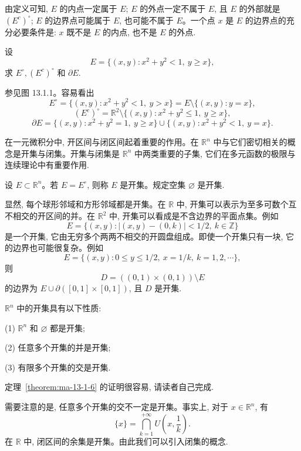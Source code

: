由定义可知, $E$ 的内点一定属于 $E$; $E$ 的外点一定不属于 $E$, 且 $E$ 的外部就是 $(E^c)^\circ$; $E$ 的边界点可能属于 $E$, 也可能不属于 $E$。一个点 $x$ 是 $E$ 的边界点的充分必要条件是: $x$ 既不是 $E$ 的内点, 也不是 $E$ 的外点.

\begin{example}\label{example:ma-13-1-4}
设
\[
  E=\{(x,y):x^2+y^2<1,\ y\geqslant x\},
\]
求 $E^\circ,(E^c)^\circ$ 和 $\partial E$.
\end{example}


\begin{solve}
参见图 13.1.1。容易看出
\[
  E^\circ=\{(x,y):x^2+y^2<1,\ y>x\}=E\setminus\{(x,y):y=x\},
\]
\[
  (E^c)^\circ=\mathbb R^2\setminus\{(x,y):x^2+y^2\leqslant1,\ y\geqslant x\},
\]
\[
  \partial E=\{(x,y):x^2+y^2=1,\ y\geqslant x\}\cup\{(x,y):x^2+y^2<1,\ y=x\}.
\]

在一元微积分中, 开区间与闭区间起着重要的作用。在 $\mathbb R^n$ 中与它们密切相关的概念是开集与闭集。开集与闭集是 $\mathbb R^n$ 中两类重要的子集, 它们在多元函数的极限与连续理论中有重要作用.
\end{solve}


\begin{definition}\label{definition:ma-13-1-6}
设 $E\subset\mathbb R^n$。若 $E=E^\circ$, 则称 $E$ 是开集。规定空集 $\varnothing$ 是开集.
\end{definition}

显然, 每个球形邻域和方形邻域都是开集。在 $\mathbb R$ 中, 开集可以表示为至多可数个互不相交的开区间的并。在 $\mathbb R^2$ 中, 开集可以看成是不含边界的平面点集。例如
\[
  E=\{(x,y): |(x,y)-(0,k)|<1/2,\ k\in\mathbb Z\}
\]
是一个开集, 它由无穷多个两两不相交的开圆盘组成。即使一个开集只有一块, 它的边界也可能很复杂。例如
\[
  E=\{(x,y):0\leqslant y\leqslant 1/2,\ x=1/k,\ k=1,2,\cdots\},
\]
则
\[
  D=((0,1)\times(0,1))\setminus E
\]
的边界为 $E\cup\partial([0,1]\times[0,1])$, 且 $D$ 是开集.

\begin{theorem}\label{theorem:ma-13-1-6}
$\mathbb R^n$ 中的开集具有以下性质:

(1) $\mathbb R^n$ 和 $\varnothing$ 都是开集;

(2) 任意多个开集的并是开集;

(3) 有限多个开集的交是开集.
\end{theorem}

定理~\ref{theorem:ma-13-1-6} 的证明很容易, 请读者自己完成.

需要注意的是, 任意多个开集的交不一定是开集。事实上, 对于 $x\in\mathbb R^n$, 有
\[
  \{x\}=\bigcap_{k=1}^{+\infty}U\left(x,\frac1k\right).
\]
在 $\mathbb R$ 中, 闭区间的余集是开集。由此我们可以引入闭集的概念.


